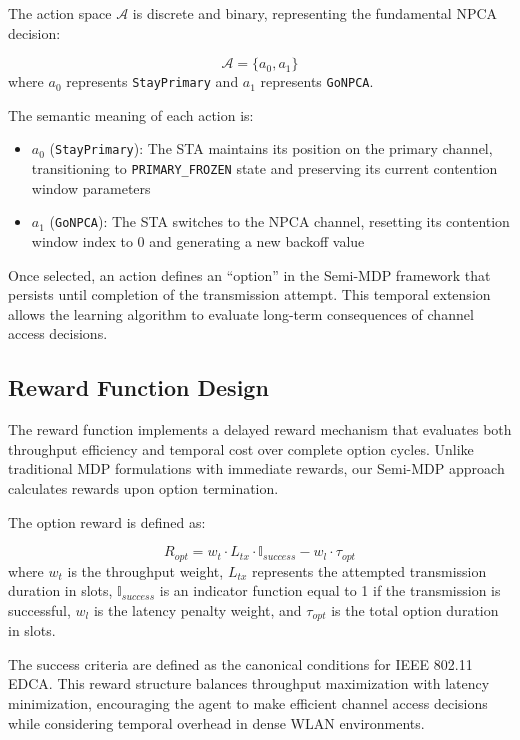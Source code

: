 \documentclass[conference]{IEEEtran}
\begin{document}
The action space $\mathcal{A}$ is discrete and binary, representing the fundamental NPCA decision:

\begin{equation}
\mathcal{A} = \{a_0, a_1\}
\label{eq:action_space}
\end{equation}
where $a_0$ represents \texttt{StayPrimary} and $a_1$ represents \texttt{GoNPCA}.

The semantic meaning of each action is:

\begin{itemize}
\item $a_0$ (\texttt{StayPrimary}): The STA maintains its position on the primary channel, transitioning to \texttt{PRIMARY\_FROZEN} state and preserving its current contention window parameters
\item $a_1$ (\texttt{GoNPCA}): The STA switches to the NPCA channel, resetting its contention window index to 0 and generating a new backoff value
\end{itemize}

Once selected, an action defines an ``option'' in the Semi-MDP framework that persists until completion of the transmission attempt. This temporal extension allows the learning algorithm to evaluate long-term consequences of channel access decisions.

\subsection{Reward Function Design}

The reward function implements a delayed reward mechanism that evaluates both throughput efficiency and temporal cost over complete option cycles. Unlike traditional MDP formulations with immediate rewards, our Semi-MDP approach calculates rewards upon option termination.

The option reward is defined as:

\begin{equation}
R_{opt} = w_t \cdot L_{tx} \cdot \mathbb{I}_{success} - w_l \cdot \tau_{opt}
\label{eq:reward_function}
\end{equation}
where $w_t$ is the throughput weight, $L_{tx}$ represents the attempted transmission duration in slots, $\mathbb{I}_{success}$ is an indicator function equal to 1 if the transmission is successful, $w_l$ is the latency penalty weight, and $\tau_{opt}$ is the total option duration in slots.

The success criteria are defined as the canonical conditions for IEEE 802.11 EDCA. This reward structure balances throughput maximization with latency minimization, encouraging the agent to make efficient channel access decisions while considering temporal overhead in dense WLAN environments.
\end{document}
